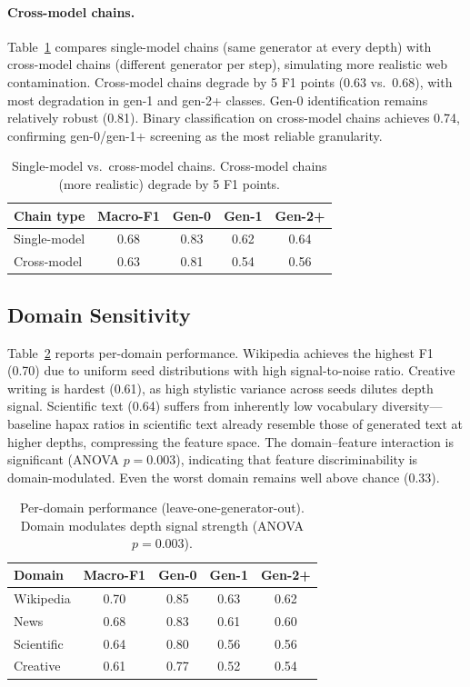 \documentclass[letterpaper,11pt]{article}
\begin{document}
\paragraph{Cross-model chains.} Table~\ref{tab:crossmodel} compares single-model chains (same generator at every depth) with cross-model chains (different generator per step), simulating more realistic web contamination. Cross-model chains degrade by 5 F1 points (0.63 vs.\ 0.68), with most degradation in gen-1 and gen-2+ classes. Gen-0 identification remains relatively robust (0.81). Binary classification on cross-model chains achieves 0.74, confirming gen-0/gen-1+ screening as the most reliable granularity.

\begin{table}[t]
\centering
\caption{Single-model vs.\ cross-model chains. Cross-model chains (more realistic) degrade by 5 F1 points.}
\label{tab:crossmodel}
\small
\begin{tabular}{lcccc}
\toprule
Chain type & Macro-F1 & Gen-0 & Gen-1 & Gen-2+ \\
\midrule
Single-model & 0.68 & 0.83 & 0.62 & 0.64 \\
Cross-model & 0.63 & 0.81 & 0.54 & 0.56 \\
\bottomrule
\end{tabular}
\end{table}

\subsection{Domain Sensitivity}
\label{sec:domain}

Table~\ref{tab:domain} reports per-domain performance. Wikipedia achieves the highest F1 (0.70) due to uniform seed distributions with high signal-to-noise ratio. Creative writing is hardest (0.61), as high stylistic variance across seeds dilutes depth signal. Scientific text (0.64) suffers from inherently low vocabulary diversity---baseline hapax ratios in scientific text already resemble those of generated text at higher depths, compressing the feature space. The domain--feature interaction is significant (ANOVA $p = 0.003$), indicating that feature discriminability is domain-modulated. Even the worst domain remains well above chance (0.33).

\begin{table}[t]
\centering
\caption{Per-domain performance (leave-one-generator-out). Domain modulates depth signal strength (ANOVA $p = 0.003$).}
\label{tab:domain}
\small
\begin{tabular}{lcccc}
\toprule
Domain & Macro-F1 & Gen-0 & Gen-1 & Gen-2+ \\
\midrule
Wikipedia & 0.70 & 0.85 & 0.63 & 0.62 \\
News & 0.68 & 0.83 & 0.61 & 0.60 \\
Scientific & 0.64 & 0.80 & 0.56 & 0.56 \\
Creative & 0.61 & 0.77 & 0.52 & 0.54 \\
\bottomrule
\end{tabular}
\end{table}
\end{document}
